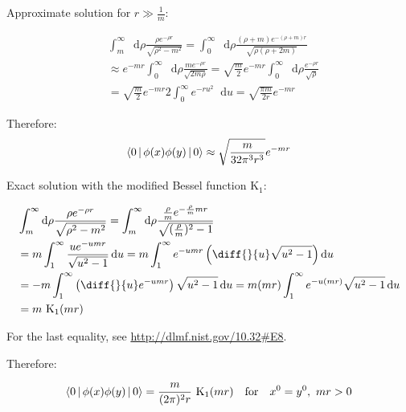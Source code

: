 \documentclass[aspectratio=169]{beamer}
\newcommand{\di}[1]{\diff{}{#1}}
\newcommand{\diffop}{\mathop{}\!\mathrm{d}}
\newcommand{\du}{\diffop u}
\newcommand{\drho}{\diffop \rho}
\newcommand{\phixy}{\Braket{0|\phi(x)\phi(y)|0}}
\newcommand{\cintegral}{\int_m^\infty \drho \frac{\rho e^{-\rho r}}{\sqrt{\rho^2 - m^2}}}
\begin{document}
\begin{frame}
Approximate solution for $r \gg \frac{1}{m}$:

\begin{equation*}
\begin{split}
&\cintegral = \int_0^\infty \drho \frac{(\rho + m)e^{-(\rho + m)r}}{\sqrt{\rho(\rho + 2m)}} \\
&\approx e^{-mr} \int_0^\infty \drho \frac{m e^{-\rho r}}{\sqrt{2m\rho}}
= \sqrt{\frac{m}{2}} e^{-mr} \int_0^\infty \drho \frac{e^{-\rho r}}{\sqrt{\rho}} \\
&= \sqrt{\frac{m}{2}} e^{-mr} 2 \int_0^\infty e^{-ru^2} \du = \sqrt{\frac{\pi m}{2r}} e^{-mr}
\end{split}
\end{equation*}

Therefore:
\begin{equation*}
\phixy \approx \sqrt{\frac{m}{32\pi^3 r^3}} e^{-mr}
\end{equation*}

\end{frame}


\begin{frame}
Exact solution with the modified Bessel function $\mathrm{K}_1$:

\begin{equation*}
\begin{split}
&\cintegral =
\int_m^\infty \drho \frac{\frac{\rho}{m} e^{-\frac{\rho}{m} mr}}{\sqrt{(\frac{\rho}{m})^2 - 1}} \\
&= m \int_1^\infty \frac{u e^{-umr}}{\sqrt{u^2 - 1}} \du = m \int_1^\infty e^{-umr} \left( \di{u} \sqrt{u^2 - 1} \right) \du \\
&= -m \int_1^\infty \left( \di{u} e^{-umr} \right) \sqrt{u^2 - 1} \du = m(mr) \int_1^\infty e^{-u(mr)} \sqrt{u^2 - 1} \du \\
&= m \  \mathrm{K}_1(mr)
\end{split}
\end{equation*}

For the last equality, see \url{http://dlmf.nist.gov/10.32\#E8}.

Therefore:

\begin{equation*}
\phixy = \frac{m}{(2\pi)^2 r} \  \mathrm{K}_1(mr) \quad \textrm{for} \quad x^0 = y^0,\ mr > 0
\end{equation*}
\end{frame}
\end{document}
